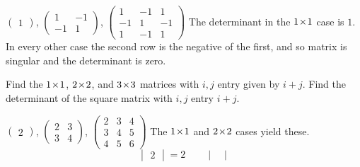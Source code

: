 \begin{exercises}
\begin{answer}
      \begin{exparts}
        \partsitem 
          $\begin{pmatrix}
            1
          \end{pmatrix}$,
          $\begin{pmatrix}
            1  &-1  \\
            -1  &1
          \end{pmatrix}$,
          $\begin{pmatrix}
            1   &-1  &1   \\
            -1  &1   &-1  \\
            1   &-1  &1
          \end{pmatrix}$
        \partsitem The determinant in the $1 \! \times \! 1$ case is $1$.
          In every other case the second row is the negative of the first,
          and so matrix is singular and the determinant is zero. 
      \end{exparts} 
    \end{answer}
  \item 
    \begin{exparts}
      \partsitem Find the $1 \! \times \! 1$, $2 \! \times \! 2$, and $3 \! \times \! 3$ matrices
        with $i,j$ entry given by $i+j$.  
      \partsitem Find the determinant of the square matrix with 
        $i,j$ entry $i+j$.
    \end{exparts}
    \begin{answer}
      \begin{exparts}
        \partsitem 
          $\begin{pmatrix}
            2
          \end{pmatrix}$,
          $\begin{pmatrix}
            2  &3  \\
            3  &4
          \end{pmatrix}$,
          $\begin{pmatrix}
            2  &3  &4  \\
            3  &4  &5  \\
            4  &5  &6
          \end{pmatrix}$
        \partsitem The $1 \! \times \! 1$ and $2 \! \times \! 2$ cases yield these.
          \begin{equation*}
            \begin{vmatrix}
              2
            \end{vmatrix}
            =2
            \qquad
            \begin{vmatrix}

\end{vmatrix}
\end{equation*}
\end{exparts}
\end{answer}
\end{exercises}
